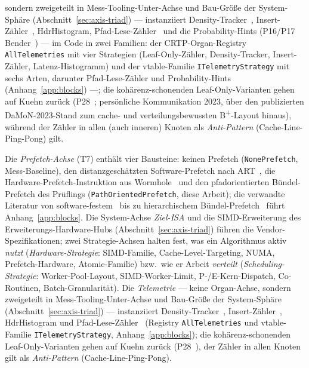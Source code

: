 \begin{nurlang}
sondern zweigeteilt in Mess-Tooling-Unter-Achse und Bau-Größe der System-Sphäre
(Abschnitt~\ref{sec:axis-triad}) --- instanziiert Density-Tracker~\cite{leis2013art},
Insert-Zähler~\cite{binna2018hot}, HdrHistogram, Pfad-Lese-Zähler~\cite{zhang2024pathprefix} und die
Probability-Hints (P16/P17 Bender~\cite{bender2000cobtree,bender2005coboblivious}) --- im Code in zwei
Familien: der CRTP-Organ-Registry \texttt{All\allowbreak{}Telemetries} mit vier Strategien (Leaf-Only-Zähler,
Density-Tracker, Insert-Zähler, Latenz-Histogramm) und der vtable-Familie
\texttt{ITelemetry\allowbreak{}Strategy} mit sechs Arten, darunter Pfad-Lese-Zähler und Probability-Hints
(Anhang~\ref{app:blocks}) ---; die
kohärenz-schonenden Leaf-Only-Varianten gehen auf Kuehn zurück (P28~\cite{kuehn2023bplustree};
persönliche Kommunikation 2023, über den publizierten DaMoN-2023-Stand zum cache- und
verteilungsbewussten B\textsuperscript{+}-Layout hinaus), während der
Zähler in allen (auch inneren) Knoten als \emph{Anti-Pattern} (Cache-Line-Ping-Pong) gilt.
\end{nurlang}
\begin{nurkurz}
Die \emph{Prefetch-Achse} (T7) enthält vier Bausteine: keinen Prefetch (\texttt{None\allowbreak{}Prefetch},
Mess-Baseline), den distanzgeschätzten Software-Prefetch nach ART~\cite{leis2013art}, die
Hardware-Prefetch-Instruktion aus Wormhole~\cite{wu2019wormhole} und den pfadorientierten Bündel-Prefetch des
Prüflings (\texttt{Path\allowbreak{}Oriented\allowbreak{}Prefetch}, diese Arbeit); die verwandte Literatur von
software-festem~\cite{chen2001prefetch} bis zu hierarchischem Bündel-Prefetch~\cite{zhang2025hierarchical}
führt Anhang~\ref{app:blocks}. Die System-Achse \emph{Ziel-ISA} und die SIMD-Erweiterung des
Erweiterungs-Hardware-Hubs (Abschnitt~\ref{sec:axis-triad}) führen die Vendor-Spezifikationen; zwei
Strategie-Achsen halten fest, was ein Algorithmus aktiv \emph{nutzt} (\emph{Hardware-Strategie}: SIMD-Familie,
Cache-Level-Targeting, NUMA, Prefetch-Hardware, Atomic-Familie) bzw.\ wie er Arbeit \emph{verteilt}
(\emph{Scheduling-Strategie}: Worker-Pool-Layout, SIMD-Worker-Limit, P-/E-Kern-Dispatch, Co-Routinen,
Batch-Granularität). Die \emph{Telemetrie} --- keine Organ-Achse, sondern zweigeteilt in
Mess-Tooling-Unter-Achse und Bau-Größe der System-Sphäre (Abschnitt~\ref{sec:axis-triad}) --- instanziiert
Density-Tracker~\cite{leis2013art}, Insert-Zähler~\cite{binna2018hot}, HdrHistogram und
Pfad-Lese-Zähler~\cite{zhang2024pathprefix} (Registry \texttt{All\allowbreak{}Telemetries} und vtable-Familie
\texttt{ITelemetry\allowbreak{}Strategy}, Anhang~\ref{app:blocks}); die kohärenz-schonenden Leaf-Only-Varianten
gehen auf Kuehn zurück (P28~\cite{kuehn2023bplustree}), der Zähler in allen Knoten gilt als
\emph{Anti-Pattern} (Cache-Line-Ping-Pong).
\end{nurkurz}

